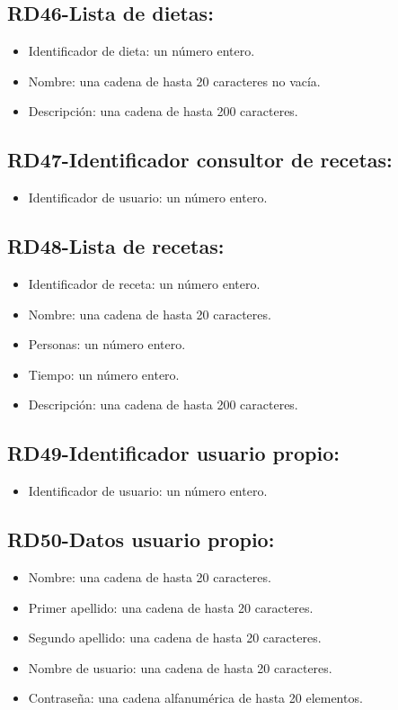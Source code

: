 \documentclass[a4paper,12pt]{report}
\begin{document}
\subsection{RD46-Lista de dietas:}
\label{sec-2-1-46}
\begin{itemize}
\item Identificador de dieta: un número entero.
\item Nombre: una cadena de hasta 20 caracteres no vacía.
\item Descripción: una cadena de hasta 200 caracteres.
\end{itemize}
\subsection{RD47-Identificador consultor de recetas:}
\label{sec-2-1-47}
\begin{itemize}
\item Identificador de usuario: un número entero.
\end{itemize}
\subsection{RD48-Lista de recetas:}
\label{sec-2-1-48}
\begin{itemize}
\item Identificador de receta: un número entero.
\item Nombre: una cadena de hasta 20 caracteres.
\item Personas: un número entero.
\item Tiempo: un número entero.
\item Descripción: una cadena de hasta 200 caracteres.
\end{itemize}
\subsection{RD49-Identificador usuario propio:}
\label{sec-2-1-49}
\begin{itemize}
\item Identificador de usuario: un número entero.
\end{itemize}
\subsection{RD50-Datos usuario propio:}
\label{sec-2-1-50}
\begin{itemize}
\item Nombre: una cadena de hasta 20 caracteres.
\item Primer apellido: una cadena de hasta 20 caracteres.
\item Segundo apellido: una cadena de hasta 20 caracteres.
\item Nombre de usuario: una cadena de hasta 20 caracteres.
\item Contraseña: una cadena alfanumérica de hasta 20 elementos.
\end{itemize}
\end{document}
